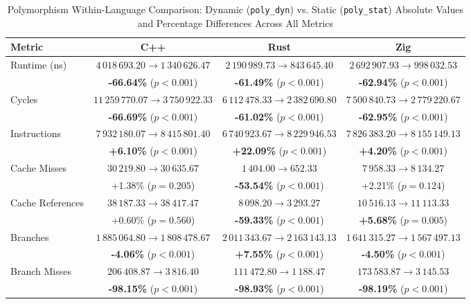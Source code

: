 \begin{table}[htbp]
\centering
\footnotesize
\caption{Polymorphism Within-Language Comparison: Dynamic (\texttt{poly\_dyn}) vs. Static (\texttt{poly\_stat}) Absolute Values and Percentage Differences Across All Metrics}
\label{tab:poly_within_lang}
\begin{tabular}{l ccc}
\toprule
\textbf{Metric} & \textbf{C++} & \textbf{Rust} & \textbf{Zig} \\
\midrule
\multirow{2}{*}{Runtime (ns)} & $4\,018\,693.20 \rightarrow 1\,340\,626.47$ & $2\,190\,989.73 \rightarrow 843\,645.40$ & $2\,692\,907.93 \rightarrow 998\,032.53$ \\
                       & \textbf{-66.64\%} ($p < 0.001$) & \textbf{-61.49\%} ($p < 0.001$) & \textbf{-62.94\%} ($p < 0.001$) \\
\midrule
\multirow{2}{*}{Cycles} & $11\,259\,770.07 \rightarrow 3\,750\,922.33$ & $6\,112\,478.33 \rightarrow 2\,382\,690.80$ & $7\,500\,840.73 \rightarrow 2\,779\,220.67$ \\
                       & \textbf{-66.69\%} ($p < 0.001$) & \textbf{-61.02\%} ($p < 0.001$) & \textbf{-62.95\%} ($p < 0.001$) \\
\midrule
\multirow{2}{*}{Instructions} & $7\,932\,180.07 \rightarrow 8\,415\,801.40$ & $6\,740\,923.67 \rightarrow 8\,229\,946.53$ & $7\,826\,383.20 \rightarrow 8\,155\,149.13$ \\
                       & \textbf{+6.10\%} ($p < 0.001$) & \textbf{+22.09\%} ($p < 0.001$) & \textbf{+4.20\%} ($p < 0.001$) \\
\midrule
\multirow{2}{*}{Cache Misses} & $30\,219.80 \rightarrow 30\,635.67$ & $1\,404.00 \rightarrow 652.33$ & $7\,958.33 \rightarrow 8\,134.27$ \\
                       & +1.38\% ($p = 0.205$) & \textbf{-53.54\%} ($p < 0.001$) & +2.21\% ($p = 0.124$) \\
\midrule
\multirow{2}{*}{Cache References} & $38\,187.33 \rightarrow 38\,417.47$ & $8\,098.20 \rightarrow 3\,293.27$ & $10\,516.13 \rightarrow 11\,113.33$ \\
                       & +0.60\% ($p = 0.560$) & \textbf{-59.33\%} ($p < 0.001$) & \textbf{+5.68\%} ($p = 0.005$) \\
\midrule
\multirow{2}{*}{Branches} & $1\,885\,064.80 \rightarrow 1\,808\,478.67$ & $2\,011\,343.67 \rightarrow 2\,163\,143.13$ & $1\,641\,315.27 \rightarrow 1\,567\,497.13$ \\
                       & \textbf{-4.06\%} ($p < 0.001$) & \textbf{+7.55\%} ($p < 0.001$) & \textbf{-4.50\%} ($p < 0.001$) \\
\midrule
\multirow{2}{*}{Branch Misses} & $206\,408.87 \rightarrow 3\,816.40$ & $111\,472.80 \rightarrow 1\,188.47$ & $173\,583.87 \rightarrow 3\,145.53$ \\
                       & \textbf{-98.15\%} ($p < 0.001$) & \textbf{-98.93\%} ($p < 0.001$) & \textbf{-98.19\%} ($p < 0.001$) \\
\bottomrule
\end{tabular}
\end{table}

